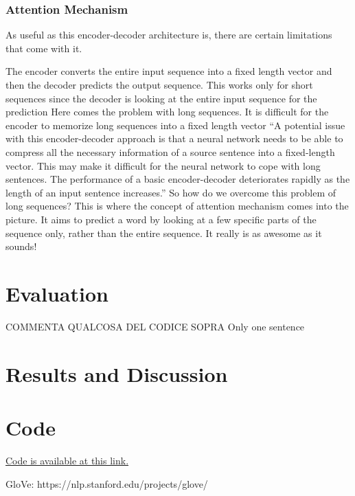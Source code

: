 \documentclass[fleqn,10pt]{SelfArx} %
\begin{document}
\subsubsection{Attention Mechanism}
As useful as this encoder-decoder architecture is, there are certain limitations that come with it.

The encoder converts the entire input sequence into a fixed length vector and then the decoder predicts the output sequence. This works only for short sequences since the decoder is looking at the entire input sequence for the prediction
Here comes the problem with long sequences. It is difficult for the encoder to memorize long sequences into a fixed length vector
“A potential issue with this encoder-decoder approach is that a neural network needs to be able to compress all the necessary information of a source sentence into a fixed-length vector. This may make it difficult for the neural network to cope with long sentences. The performance of a basic encoder-decoder deteriorates rapidly as the length of an input sentence increases.”
So how do we overcome this problem of long sequences? This is where the concept of attention mechanism comes into the picture. It aims to predict a word by looking at a few specific parts of the sequence only, rather than the entire sequence. It really is as awesome as it sounds!
\section{Evaluation}
COMMENTA QUALCOSA DEL CODICE SOPRA
Only one sentence
\section{Results and Discussion}
\section*{Code}
\href{https://github.com/RCrvro/Text-Summarization-Project}{Code is available at this link.}



GloVe: https://nlp.stanford.edu/projects/glove/
\end{document}
